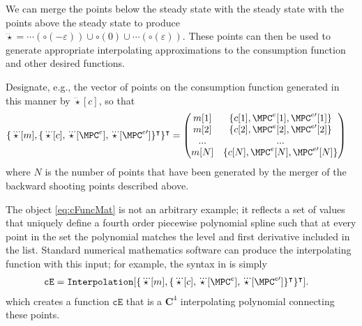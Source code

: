 \documentclass{\handout}
\begin{document}
We can merge the points below the steady state with the steady state
with the points above the steady state to produce $\dddot{\star} =
\cdots(\pmb{\circ}(-\varepsilon)) \cup \pmb{\circ}(0) \cup
\cdots(\pmb{\circ}(\varepsilon)) $.  These points can then be used to
generate appropriate interpolating approximations to the consumption
function and other desired functions.

Designate, e.g., the vector of points on the consumption function
generated in this manner by $\dddot{\star}[c]$, so that 
\begin{equation}\begin{gathered}\begin{aligned}
   \{\dddot{\star}[m],\{\dddot{\star}[c],\dddot{\star}[\MPC^{e}],\dddot{\star}[\MPC^{e\prime}]\}^{\intercal}\}^{\intercal} & =  
\begin{pmatrix}
m[1] & \{c[1],\MPC^{e}[1],\MPC^{e\prime}[1]\} \\
m[2] & \{c[2],\MPC^{e}[2],\MPC^{e\prime}[2]\} \\
...  & ...              \\
m[N] & \{c[N],\MPC^{e}[N],\MPC^{e\prime}[N]\} \\
\end{pmatrix} \label{eq:cFuncMat}
\end{aligned}\end{gathered}\end{equation}
where $N$ is the number of points that have been generated by the merger of the backward
shooting points described above.  

The object \eqref{eq:cFuncMat} is not an arbitrary example; it reflects a set of values that 
uniquely define a fourth order piecewise polynomial spline such that at every point in the 
set the polynomial matches the level and first derivative included in the list.  Standard
numerical mathematics software can produce the interpolating function with this input; 
for example, the syntax in \Mma is simply
\begin{equation}\begin{gathered}\begin{aligned}
  \mathtt{cE} & =  \mathtt{Interpolation}[\{\dddot{\star}[m],\{\dddot{\star}[c],\dddot{\star}[\MPC^{e}],\dddot{\star}[\MPC^{e\prime}]\}^{\intercal}\}^{\intercal}].
\end{aligned}\end{gathered}\end{equation}
which creates a function $\texttt{cE}$ that is a $\mathbf{C}^4$ interpolating polynomial
connecting these points.
\end{document}
